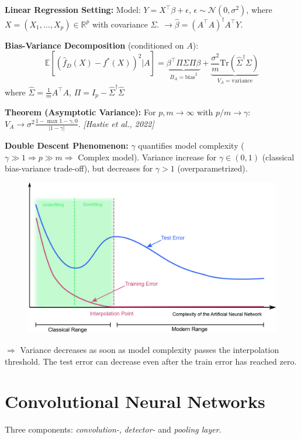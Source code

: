 \documentclass[a4paper,10pt]{article}
\def\R{\mathbb{R}}
\begin{document}
\begin{small}
\textbf{Linear Regression Setting:}
Model: $Y = X^\top\beta + \epsilon$, $\epsilon \sim \mathcal{N}(0,\sigma^2)$, where $X=(X_1,...,X_p) \in \R^p$ with covariance $\Sigma$. $\rightarrow \hat{\beta} = (A^\top A)^\dagger A^\top Y$.

\textbf{Bias-Variance Decomposition} (conditioned on $A$): \vspace{-10pt}
$$\mathbb{E}[(\hat{f}_D(X) - f^*(X))^2|A] = \underbrace{\beta^\top\Pi\Sigma\Pi\beta}_{B_A=\text{bias}^2} + \underbrace{\frac{\sigma^2}{m}\text{Tr}(\hat{\Sigma}^\dagger\Sigma)}_{V_A=\text{variance}}$$
where $\hat{\Sigma} = \frac{1}{m}A^\top A$, $\Pi = I_p - \hat{\Sigma}^\dagger\hat{\Sigma}$

\textbf{Theorem (Asymptotic Variance):}
For $p,m\to\infty$ with $p/m\to\gamma$:
$V_A \to \sigma^2\frac{1-\max{1-\gamma,0}}{|1-\gamma|}$. \textit{[Hastie et al., 2022]}

\textbf{Double Descent Phenomenon:} $\gamma$ quantifies model complexity ($\gamma \gg 1 \Rightarrow p \gg m \Rightarrow $ Complex model). Variance increase for $\gamma \in (0,1)$ (classical bias-variance trade-off), but decreases for $\gamma > 1$ (overparametrized).


\begin{figure}
    \centering
    \vspace{-20pt}
    \includegraphics[width=0.45\columnwidth]{figures/double_descent_curve.jpg}
    \vspace{-30pt}
\end{figure}

$\Rightarrow$ Variance decreases as soon as model complexity passes the interpolation threshold. The test error can decrease even after the train error has reached zero.

\newpage

\section{Convolutional Neural Networks}

Three components: \textit{convolution-}, \textit{detector-} and \textit{pooling layer}.


\end{small}
\end{document}
